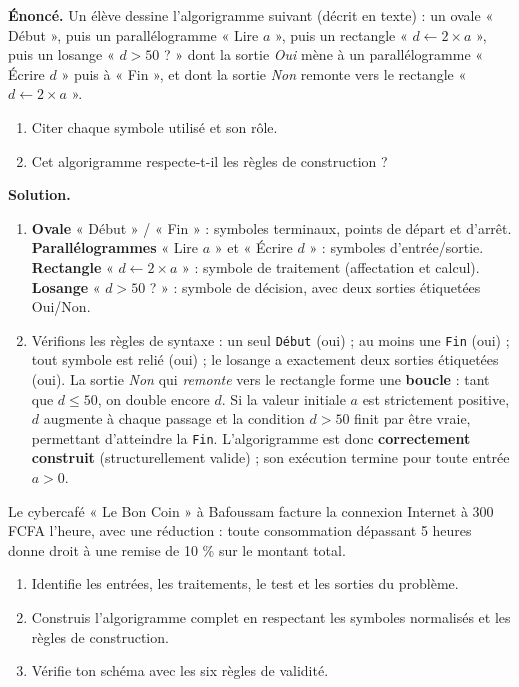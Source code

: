 \documentclass[11pt]{article}
\begin{document}
\begin{exoresolu}
\textbf{Énoncé.} Un élève dessine l'algorigramme suivant (décrit en texte) : un ovale « Début », puis un parallélogramme « Lire $a$ », puis un rectangle « $d \leftarrow 2 \times a$ », puis un losange « $d > 50$ ? » dont la sortie \emph{Oui} mène à un parallélogramme « Écrire $d$ » puis à « Fin », et dont la sortie \emph{Non} remonte vers le rectangle « $d \leftarrow 2 \times a$ ».
\begin{enumerate}
\item Citer chaque symbole utilisé et son rôle.
\item Cet algorigramme respecte-t-il les règles de construction ?
\end{enumerate}
\tcblower
\textbf{Solution.}
\begin{enumerate}
\item \textbf{Ovale} « Début » / « Fin » : symboles terminaux, points de départ et d'arrêt. \textbf{Parallélogrammes} « Lire $a$ » et « Écrire $d$ » : symboles d'entrée/sortie. \textbf{Rectangle} « $d \leftarrow 2 \times a$ » : symbole de traitement (affectation et calcul). \textbf{Losange} « $d > 50$ ? » : symbole de décision, avec deux sorties étiquetées Oui/Non.
\item Vérifions les règles de syntaxe : un seul \texttt{Début} (oui) ; au moins une \texttt{Fin} (oui) ; tout symbole est relié (oui) ; le losange a exactement deux sorties étiquetées (oui). La sortie \emph{Non} qui \emph{remonte} vers le rectangle forme une \textbf{boucle} : tant que $d \leq 50$, on double encore $d$. Si la valeur initiale $a$ est strictement positive, $d$ augmente à chaque passage et la condition $d > 50$ finit par être vraie, permettant d'atteindre la \texttt{Fin}. L'algorigramme est donc \textbf{correctement construit} (structurellement valide) ; son exécution termine pour toute entrée $a > 0$.
\end{enumerate}
\end{exoresolu}

\begin{exercice}
Le cybercafé « Le Bon Coin » à Bafoussam facture la connexion Internet à \num{300} FCFA l'heure, avec une réduction : toute consommation dépassant 5 heures donne droit à une remise de 10 \% sur le montant total.
\begin{enumerate}
\item Identifie les entrées, les traitements, le test et les sorties du problème.
\item Construis l'algorigramme complet en respectant les symboles normalisés et les règles de construction.
\item Vérifie ton schéma avec les six règles de validité.
\end{enumerate}
\end{exercice}
\end{document}
